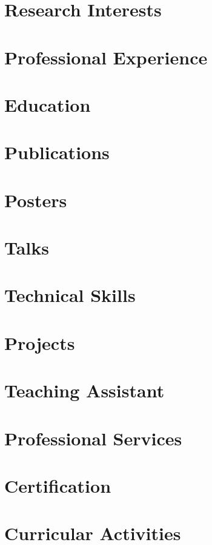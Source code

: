 \documentclass[10pt,a4paper,calibri]{moderncv}
\begin{document}
\makecvtitle{}
\vspace{-32pt}

\section{Research Interests}


\section{Professional Experience}


\section{Education}


\section{Publications}


\section{Posters}


\section{Talks}


% 

\section{Technical Skills}


\section{Projects}


\section{Teaching Assistant}


\section{Professional Services}


\section{Certification}


\section{Curricular Activities}

\end{document}
